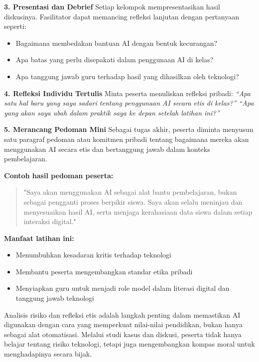 \textbf{3. Presentasi dan Debrief}
Setiap kelompok mempresentasikan hasil diskusinya. Fasilitator dapat memancing refleksi lanjutan dengan pertanyaan seperti:
\begin{itemize}
	\item Bagaimana membedakan bantuan AI dengan bentuk kecurangan?
	\item Apa batas yang perlu disepakati dalam penggunaan AI di kelas?
	\item Apa tanggung jawab guru terhadap hasil yang dihasilkan oleh teknologi?
\end{itemize}

\textbf{4. Refleksi Individu Tertulis}
Minta peserta menuliskan refleksi pribadi:  
\textit{“Apa satu hal baru yang saya sadari tentang penggunaan AI secara etis di kelas?”}  
\textit{“Apa yang akan saya ubah dalam praktik saya ke depan setelah latihan ini?”}

\textbf{5. Merancang Pedoman Mini}
Sebagai tugas akhir, peserta diminta menyusun satu paragraf pedoman atau komitmen pribadi tentang bagaimana mereka akan menggunakan AI secara etis dan bertanggung jawab dalam konteks pembelajaran.

\textbf{Contoh hasil pedoman peserta:}
\begin{quote}
	"Saya akan menggunakan AI sebagai alat bantu pembelajaran, bukan sebagai pengganti proses berpikir siswa. Saya akan selalu meninjau dan menyesuaikan hasil AI, serta menjaga kerahasiaan data siswa dalam setiap interaksi digital."
\end{quote}

\textbf{Manfaat latihan ini:}
\begin{itemize}
	\item Menumbuhkan kesadaran kritis terhadap teknologi
	\item Membantu peserta mengembangkan standar etika pribadi
	\item Menyiapkan guru untuk menjadi role model dalam literasi digital dan tanggung jawab teknologi
\end{itemize}

Analisis risiko dan refleksi etis adalah langkah penting dalam memastikan AI digunakan dengan cara yang memperkuat nilai-nilai pendidikan, bukan hanya sebagai alat otomatisasi. Melalui studi kasus dan diskusi, peserta tidak hanya belajar tentang risiko teknologi, tetapi juga mengembangkan kompas moral untuk menghadapinya secara bijak.

